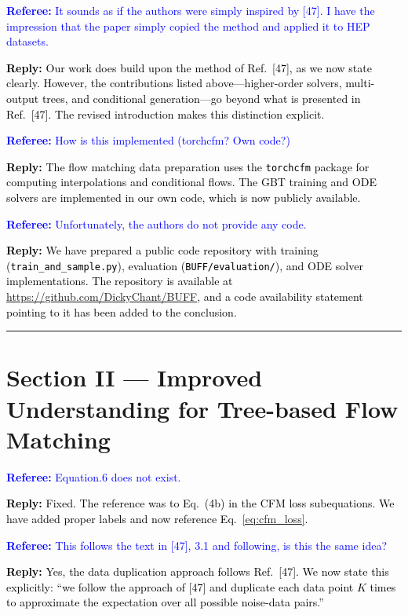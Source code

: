 \documentclass[11pt]{article}
\newcommand{\refcomment}[1]{\textcolor{blue}{\textbf{Referee:} #1}}
\newcommand{\reply}[1]{\textcolor{black}{\textbf{Reply:} #1}}
\begin{document}
\bigskip

\refcomment{It sounds as if the authors were simply inspired by [47]. I have the impression that the paper simply copied the method and applied it to HEP datasets.}

\reply{Our work does build upon the method of Ref.~[47], as we now state clearly. However, the contributions listed above---higher-order solvers, multi-output trees, and conditional generation---go beyond what is presented in Ref.~[47]. The revised introduction makes this distinction explicit.}

\bigskip

\refcomment{How is this implemented (torchcfm? Own code?)}

\reply{The flow matching data preparation uses the \texttt{torchcfm} package for computing interpolations and conditional flows. The GBT training and ODE solvers are implemented in our own code, which is now publicly available.}

\bigskip

\refcomment{Unfortunately, the authors do not provide any code.}

\reply{We have prepared a public code repository with training (\texttt{train\_and\_sample.py}), evaluation (\texttt{BUFF/evaluation/}), and ODE solver implementations. The repository is available at \url{https://github.com/DickyChant/BUFF}, and a code availability statement pointing to it has been added to the conclusion.}

\bigskip
\hrule
\bigskip

\section*{Section II --- Improved Understanding for Tree-based Flow Matching}

\refcomment{Equation.6 does not exist.}

\reply{Fixed. The reference was to Eq.~(4b) in the CFM loss subequations. We have added proper labels and now reference Eq.~\eqref{eq:cfm_loss}.}

\bigskip

\refcomment{This follows the text in [47], 3.1 and following, is this the same idea?}

\reply{Yes, the data duplication approach follows Ref.~[47]. We now state this explicitly: ``we follow the approach of [47] and duplicate each data point $K$ times to approximate the expectation over all possible noise-data pairs.''}
\end{document}
